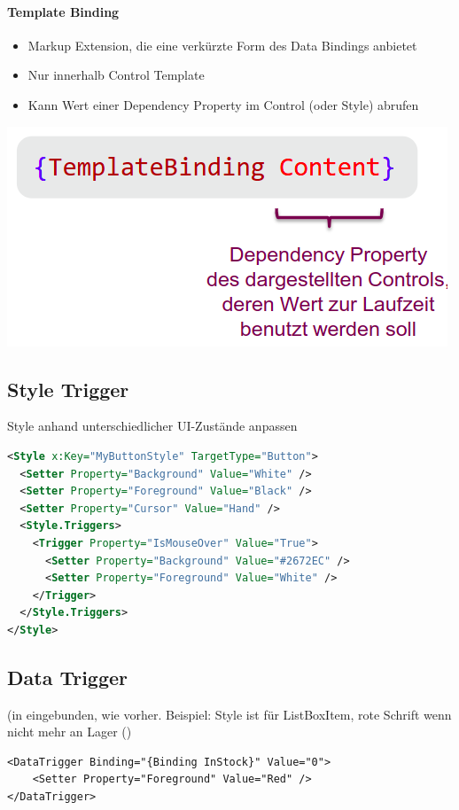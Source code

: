 \paragraph{Template Binding}
\begin{itemize}
    \item Markup Extension, die eine verkürzte Form des Data Bindings anbietet
    \item Nur innerhalb Control Template
    \item Kann Wert einer Dependency Property im Control (oder Style) abrufen
\end{itemize}
\includegraphics[scale=0.3]{img/template-binding.png}

\subsection{Style Trigger}
Style anhand unterschiedlicher UI-Zustände anpassen
\begin{lstlisting}[language=xml]
<Style x:Key="MyButtonStyle" TargetType="Button"> 
  <Setter Property="Background" Value="White" /> 
  <Setter Property="Foreground" Value="Black" /> 
  <Setter Property="Cursor" Value="Hand" /> 
  <Style.Triggers> 
    <Trigger Property="IsMouseOver" Value="True"> 
      <Setter Property="Background" Value="#2672EC" /> 
      <Setter Property="Foreground" Value="White" /> 
    </Trigger> 
  </Style.Triggers> 
</Style> 
\end{lstlisting}


\subsection{Data Trigger}
(in  eingebunden, wie vorher. Beispiel: Style ist für ListBoxItem, rote Schrift wenn nicht mehr an Lager ()
\begin{lstlisting}
<DataTrigger Binding="{Binding InStock}" Value="0">
    <Setter Property="Foreground" Value="Red" />
</DataTrigger>
\end{lstlisting}

